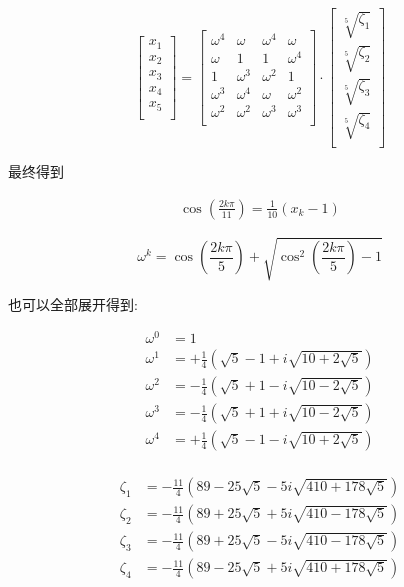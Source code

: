 $$
\begin{bmatrix}
x_1\\x_2\\x_3\\x_4\\x_5\\
\end{bmatrix}=
\begin{bmatrix}
ω^4 & ω   & ω^4 & ω   \\
ω   & 1   & 1   & ω^4 \\
1   & ω^3 & ω^2 & 1   \\
ω^3 & ω^4 & ω   & ω^2 \\
ω^2 & ω^2 & ω^3 & ω^3 \\
\end{bmatrix}⋅
\begin{bmatrix}
\sqrt[5]{ζ_1} \\
\sqrt[5]{ζ_2} \\
\sqrt[5]{ζ_3} \\
\sqrt[5]{ζ_4} \\
\end{bmatrix}
$$


最终得到

$$
\begin{aligned}
\cos\left(\frac{2kπ}{11}\right) = \frac{1}{10}\left(x_k-1\right)
\end{aligned}
$$

$$
ω^k
=\cos\left(\frac{2kπ}{5}\right)
+\sqrt{\cos^2\left(\frac{2kπ}{5}\right)-1}
$$

也可以全部展开得到:

$$
\begin{aligned}
ω^0 &= 1\\
ω^1 &=+\frac{1}{4} \left(\sqrt{5}-1+i\sqrt{10+2\sqrt{5}}\right) \\
ω^2 &=-\frac{1}{4} \left(\sqrt{5}+1-i\sqrt{10-2\sqrt{5}}\right) \\
ω^3 &=-\frac{1}{4} \left(\sqrt{5}+1+i\sqrt{10-2\sqrt{5}}\right) \\
ω^4 &=+\frac{1}{4} \left(\sqrt{5}-1-i\sqrt{10+2\sqrt{5}}\right) \\
\end{aligned}
$$

$$
\begin{aligned}
ζ_1&=-\frac{11}{4} \left(89-25 \sqrt{5}-5 i \sqrt{410+178 \sqrt{5}}\right) \\
ζ_2&=-\frac{11}{4} \left(89+25 \sqrt{5}+5 i \sqrt{410-178 \sqrt{5}}\right) \\
ζ_3&=-\frac{11}{4} \left(89+25 \sqrt{5}-5 i \sqrt{410-178 \sqrt{5}}\right) \\
ζ_4&=-\frac{11}{4} \left(89-25 \sqrt{5}+5 i \sqrt{410+178 \sqrt{5}}\right) \\
\end{aligned}
$$


